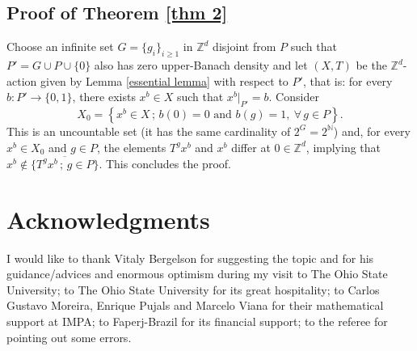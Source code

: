 \documentclass[reqno]{amsart}
\theoremstyle{definition}
\theoremstyle{remark}
\numberwithin{equation}{section}
\numberwithin{theorem}{section}
\begin{document}
\subsection{Proof of Theorem \ref{thm 2}}

Choose an infinite set $G=\{g_i\}_{i\ge 1}$ in ${\mathbb{Z}}^d$ disjoint from $P$ such that $P'=G\cup P\cup\{0\}$
also has zero upper-Banach density and let $(X,T)$ be the ${\mathbb{Z}}^d$-action given by Lemma \ref{essential lemma}
with respect to $P'$, that is: for every $b:P'\rightarrow\{0,1\}$, there exists $x^b\in X$ such that
$x^b|_{P'}=b$. Consider
$$X_0=\left\{x^b\in X\,;\,b(0)=0\text{ and }b(g)=1,\ \forall\,g\in P\right\}.$$
This is an uncountable set (it has the same cardinality of $2^G=2^{\mathbb{N}}$) and, for every $x^b\in X_0$ and $g\in P$,
the elements $T^gx^b$ and $x^b$ differ at $0\in{\mathbb{Z}}^d$, implying that $x^b\not\in\overline{\{T^gx^b\,;\,g\in P\}}$.
This concludes the proof.

\section*{Acknowledgments}
I would like to thank Vitaly Bergelson for suggesting the topic and for his guidance/advices and enormous
optimism during my visit to The Ohio State University; to The Ohio State University for its great hospitality;
to Carlos Gustavo Moreira, Enrique Pujals and Marcelo Viana for their mathematical support at IMPA;
to Faperj-Brazil for its financial support; to the referee for pointing out some errors.
\end{document}
